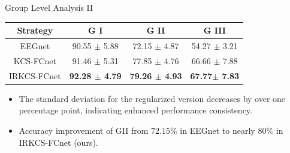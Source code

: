 \documentclass[aspectratio=169]{beamer}
\begin{document}
\begin{frame}{Group Level Analysis II}
    \begin{table}
        \centering
        \begin{tabular}{|c|c|c|c|}
            \hline
            Strategy & G I & G II  & G III \\
            \hline
            EEGnet & 90.55 $\pm$ 5.88 & 72.15 $\pm$ 4.87 & 54.27 $\pm$ 3.21 \\
            KCS-FCnet & 91.46 $\pm$ 5.31   &  77.85 $\pm$ 4.76 & 66.66 $\pm$ 7.88 \\
            IRKCS-FCnet & \textbf{92.28 $\pm$ 4.79}  & \textbf{79.26 $\pm$ 4.93}  & \textbf{67.77$\pm$ 7.83} \\
            \hline
        \end{tabular}
    \end{table}
    \begin{itemize}
        \item The standard deviation for the regularized version decreases by over one percentage point, indicating enhanced performance consistency.
        \item Accuracy improvement of GII from $72.15\%$ in EEGnet to nearly $80\%$ in IRKCS-FCnet (ours).
    \end{itemize}
\end{frame}
\end{document}
